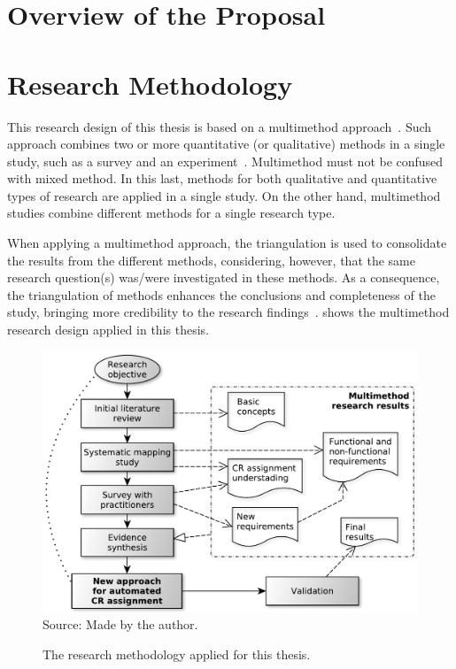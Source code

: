 \section{Overview of the Proposal}
\lipsum[1-5]

\section{Research Methodology}

This research design of this thesis is based on a multimethod
approach~\citep{Hesse-Biber2010}. Such approach combines two or more
quantitative (or qualitative) methods in a single study, such as a survey and an
experiment~\citep{Hesse-Biber2010}. Multimethod must not be confused with mixed
method. In this last, methods for both qualitative and quantitative types of
research are applied in a single study. On the other hand, multimethod studies
combine different methods for a single research type.

When applying a multimethod approach, the triangulation is used to consolidate
the results from the different methods, considering, however, that the same
research question(s) was/were investigated in these methods. As a consequence,
the triangulation of methods enhances the conclusions and completeness of the
study, bringing more credibility to the research
findings~\citep{Hesse-Biber2010}.  shows
the multimethod research design applied in this thesis.

\begin{figure}[h]
\centering
  \caption[Research methodology.]{The research methodology applied for this
  thesis.}
  \includegraphics[width=\columnwidth]{images/research-methodology-thesis.pdf}
  \footnotesize{Source: Made by the author.}
  \label{fig:research-methodology-thesis}
\end{figure}

